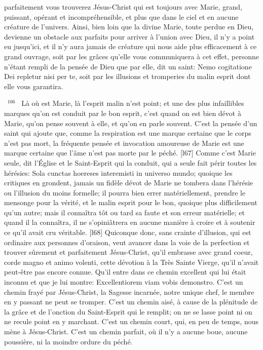\documentclass[paper=a5,pagesize=pdftex,fontsize=15pt,headinclude=on,twoside=off]{scrbook}
\newcommand{\negphantom}[1]{\settowidth{\dimen0}{#1}\hspace*{-\dimen0}}
\newcommand{\versenb}[1]{\par \vspace{10pt}~\negphantom{~${}^{#1}$~}${}^{#1}$~}
\begin{document}
parfaitement vous trouverez Jésus-Christ qui est toujours avec Marie, grand, puissant, opérant et
incompréhensible, et plus que dans le ciel et en aucune créature de l'univers. Ainsi, bien loin que la divine Marie,
toute perdue en Dieu, devienne un obstacle aux parfaits pour arriver à l'union avec Dieu, il n'y a point eu jusqu'ici,
et il n'y aura jamais de créature qui nous aide plus efficacement à ce grand ouvrage, soit par les grâces qu'elle
vous communiquera à cet effet, personne n'étant rempli de la pensée de Dieu que par elle, dit un saint: Nemo
cogitatione Dei repletur nisi per te, soit par les illusions et tromperies du malin esprit dont elle vous garantira.
\versenb{166} Là où est Marie, là l'esprit malin n'est point; et une des plus infaillibles marques qu'on est conduit par le bon
esprit, c'est quand on est bien dévot à Marie, qu'on pense souvent à elle, et qu'on en parle souvent. C'est la
pensée d'un saint qui ajoute que, comme la respiration est une marque certaine que le corps n'est pas mort, la
fréquente pensée et invocation amoureuse de Marie est une marque certaine que l'âme n'est pas morte par le
péché.
[l67] Comme c'est Marie seule, dit l'Église et le Saint-Esprit qui la conduit, qui a seule fait périr toutes les hérésies:
Sola cunctas hoereses interemisti in universo mundo; quoique les critiques en grondent, jamais un fidèle dévot de
Marie ne tombera dans l'hérésie ou l'illusion du moins formelle; il pourra bien errer matériellement, prendre le
mensonge pour la vérité, et le malin esprit pour le bon, quoique plus difficilement qu'un autre; mais il connaîtra tôt
ou tard sa faute et son erreur matérielle; et quand il la connaîtra, il ne s'opiniâtrera en aucune manière à croire et à
soutenir ce qu'il avait cru véritable.
[l68] Quiconque donc, sans crainte d'illusion, qui est ordinaire aux personnes d'oraison, veut avancer dans la voie
de la perfection et trouver sûrement et parfaitement Jésus-Christ, qu'il embrasse avec grand coeur, corde magno
et animo volenti, cette dévotion à la Très Sainte Vierge, qu'il n'avait peut-être pas encore connue. Qu'il entre dans
ce chemin excellent qui lui était inconnu et que je lui montre: Excellentiorem viam vobis demonstro. C'est un
chemin frayé par Jésus-Christ, la Sagesse incarnée, notre unique chef, le membre en y passant ne peut se
tromper. C'est un chemin aisé, à cause de la plénitude de la grâce et de l'onction du Saint-Esprit qui le remplit; on
ne se lasse point ni on ne recule point en y marchant. C'est un chemin court, qui, en peu de temps, nous mène à
Jésus-Christ. C'est un chemin parfait, où il n'y a aucune boue, aucune poussière, ni la moindre ordure du péché.
\end{document}
